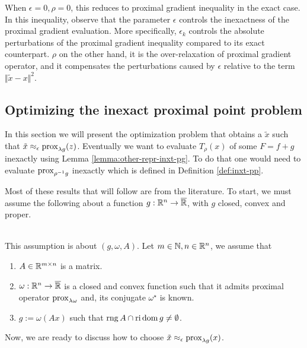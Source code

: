 \documentclass[12pt]{article}
\DeclareMathOperator{\rng}{\mathop{rng}}
\begin{document}
        \begin{remark}
            When $\epsilon = 0, \rho = 0$, this reduces to proximal gradient inequality in the exact case. 
            In this inequality, observe that the parameter $\epsilon$ controls the inexactness of the proximal gradient evaluation. 
            More specifically, $\epsilon_k$ controls the absolute perturbations of the proximal gradient inequality compared to its exact counterpart. 
            $\rho$ on the other hand, it is the over-relaxation of proximal gradient operator, and it compensates the perturbations caused by $\epsilon$ relative to the term $\Vert \tilde x - x\Vert^2$. 
        \end{remark}
    \subsection{Optimizing the inexact proximal point problem}
        In this section we will present the optimization problem that obtains a $\tilde x$ such that $\tilde x \approx_\epsilon \operatorname{prox}_{\lambda g}(z)$. 
        Eventually we want to evaluate $T_{\rho}(x)$ of some $F = f + g$ inexactly using Lemma \ref{lemma:other-repr-inxt-pg}. 
        To do that one would need to evaluate $\operatorname{prox}_{\rho^{-1}g}$ inexactly which is defined in Definition \ref{def:inxt-pp}. 
        \par
        Most of these results that will follow are from the literature. 
        To start, we must assume the following about a function $g: \mathbb R^n \rightarrow \overline {\mathbb R}$, with $g$ closed, convex and proper. 
        \begin{assumption}\;\label{ass:for-inxt-prox}\\
            This assumption is about $(g, \omega, A)$. 
            Let $m \in \mathbb N, n \in \mathbb R^n$, we assume that 
            \begin{enumerate}[nosep]
                \item $A\in \mathbb R^{m \times n}$ is a matrix. 
                \item $\omega: \mathbb R^n \rightarrow \overline {\mathbb R}$ is a closed and convex function such that it admits proximal operator $\operatorname{prox}_{\lambda\omega}$ and, its conjugate $\omega^\star$ is known. 
                \item $g := \omega(Ax)$ such that $\rng A \cap \reli\dom g \neq\emptyset$. 
            \end{enumerate}
        \end{assumption}
        Now, we are ready to discuss how to choose $\tilde x \approx_\epsilon \operatorname{prox}_{\lambda g}(x)$. 
\end{document}
